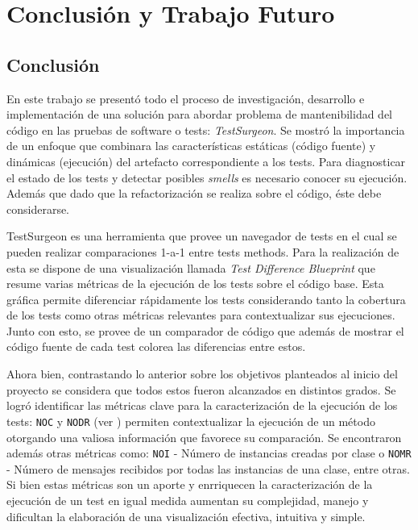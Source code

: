 \chapter{Conclusión y Trabajo Futuro}

\section{Conclusión}

\par En este trabajo se presentó todo el proceso de investigación, desarrollo e implementación de una solución para abordar problema de mantenibilidad del código en las pruebas de software o tests: \emph{TestSurgeon}. Se mostró la importancia de un enfoque que combinara las características estáticas (código fuente) y dinámicas (ejecución) del artefacto correspondiente a los tests. Para diagnosticar el estado de los tests y detectar posibles \emph{smells} es necesario conocer su ejecución. Además que dado que la refactorización se realiza sobre el código, éste debe considerarse.

\par TestSurgeon es una herramienta que provee un navegador de tests en el cual se pueden realizar comparaciones 1-a-1 entre tests methods. Para la realización de esta se dispone de una visualización llamada \emph{Test Difference Blueprint} que resume varias métricas de la ejecución de los tests sobre el código base. Esta gráfica permite diferenciar rápidamente los tests considerando tanto la cobertura de los tests como otras métricas relevantes para contextualizar sus ejecuciones. Junto con esto, se provee de un comparador de código que además de mostrar el código fuente de cada test colorea las diferencias entre estos.  


\par Ahora bien, contrastando lo anterior sobre los objetivos planteados al inicio del proyecto se considera que todos estos fueron alcanzados en distintos grados. Se logró identificar las métricas clave para la caracterización de la ejecución de los tests: {\tt NOC} y {\tt NODR} (ver ) permiten contextualizar la ejecución de un método otorgando una valiosa información que favorece su comparación. Se encontraron además otras métricas como: {\tt NOI} - Número de instancias creadas por clase o {\tt NOMR} - Número de mensajes recibidos por todas las instancias de una clase, entre otras. Si bien estas métricas son un aporte y enrriquecen la caracterización de la ejecución de un test en igual medida aumentan su complejidad, manejo y dificultan la elaboración de una visualización efectiva, intuitiva y simple. 


